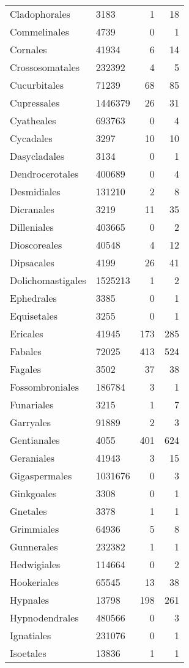 \documentclass{article}
\begin{document}
\begin{longtabu}{lXRR}
Cladophorales & 3183 & 1 & 18\\
Commelinales & 4739 & 0 & 1\\
Cornales & 41934 & 6 & 14\\
Crossosomatales & 232392 & 4 & 5\\
Cucurbitales & 71239 & 68 & 85\\
Cupressales & 1446379 & 26 & 31\\
Cyatheales & 693763 & 0 & 4\\
Cycadales & 3297 & 10 & 10\\
Dasycladales & 3134 & 0 & 1\\
Dendrocerotales & 400689 & 0 & 4\\
Desmidiales & 131210 & 2 & 8\\
Dicranales & 3219 & 11 & 35\\
Dilleniales & 403665 & 0 & 2\\
Dioscoreales & 40548 & 4 & 12\\
Dipsacales & 4199 & 26 & 41\\
Dolichomastigales & 1525213 & 1 & 2\\
Ephedrales & 3385 & 0 & 1\\
Equisetales & 3255 & 0 & 1\\
Ericales & 41945 & 173 & 285\\
Fabales & 72025 & 413 & 524\\
Fagales & 3502 & 37 & 38\\
Fossombroniales & 186784 & 3 & 1\\
Funariales & 3215 & 1 & 7\\
Garryales & 91889 & 2 & 3\\
Gentianales & 4055 & 401 & 624\\
Geraniales & 41943 & 3 & 15\\
Gigaspermales & 1031676 & 0 & 3\\
Ginkgoales & 3308 & 0 & 1\\
Gnetales & 3378 & 1 & 1\\
Grimmiales & 64936 & 5 & 8\\
Gunnerales & 232382 & 1 & 1\\
Hedwigiales & 114664 & 0 & 2\\
Hookeriales & 65545 & 13 & 38\\
Hypnales & 13798 & 198 & 261\\
Hypnodendrales & 480566 & 0 & 3\\
Ignatiales & 231076 & 0 & 1\\
Isoetales & 13836 & 1 & 1\\

\end{longtabu}
\end{document}
